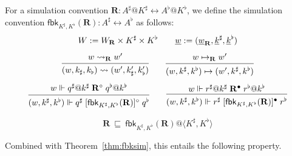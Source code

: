 \documentclass[acmsmall,screen,review,anonymous]{acmart}
\newcommand{\kw}[1]{\ensuremath{ \mathsf{#1} }}
\newcommand{\que}{\circ}
\newcommand{\ans}{\bullet}
\newcommand{\intl}[1]{\underline{#1}}
\begin{document}
\begin{definition}
For a simulation convention
$\mathbf{R} : A^\sharp@K^\sharp \leftrightarrow A^\flat@K^\flat$,
we define the simulation convention
$\kw{fbk}_{K^\sharp,K^\flat}(\mathbf{R}) :
 A^\sharp \leftrightarrow A^\flat$
as follows:
\begin{gather*}
  W := W_\mathbf{R} \times K^\sharp \times K^\flat
  \qquad \intl{w} := (\intl{w}_\mathbf{R}, \intl{k}^\sharp, \intl{k}^\flat)
  \\[1ex]
 {\begin{prooftree}
    \hypo{w \leadsto_\mathbf{R} w'}
    \infer1{(w, k_\sharp, k_\flat) \leadsto (w', k_\sharp', k_\flat')}
  \end{prooftree}}
  \qquad
 {\begin{prooftree}
    \hypo{w \mapsto_\mathbf{R} w'}
    \infer1{(w, k^\sharp, k^\flat) \mapsto (w', k^\sharp, k^\flat)}
  \end{prooftree}}
  \\[1ex]
 {\begin{prooftree}
    \hypo{w \Vdash q^\sharp@k^\sharp \mathrel{\mathbf{R}^\que}
                   q^\flat@k^\flat}
    \infer1{
      (w, k^\sharp, k^\flat) \Vdash
      q^\sharp
      \mathrel{[\kw{fbk}_{K^\sharp,K^\flat}(\mathbf{R})]^\que}
      q^\flat}
  \end{prooftree}}
  \qquad
 {\begin{prooftree}
    \hypo{w \Vdash r^\sharp@k^\sharp \mathrel{\mathbf{R}^\ans}
                   r^\flat@k^\flat}
    \infer1{
      (w, k^\sharp, k^\flat) \Vdash
      r^\sharp
      \mathrel{[\kw{fbk}_{K^\sharp,K^\flat}(\mathbf{R})]^\ans}
      r^\flat}
  \end{prooftree}}
\end{gather*}
\end{definition}

\begin{lemma}
\[
  \mathbf{R}
  \:\sqsubseteq\:
  \kw{fbk}_{K^\sharp,K^\flat}(\mathbf{R})@\langle K^\sharp, K^\flat \rangle
\]
\end{lemma}


Combined with Theorem~\ref{thm:fbksim},
this entails the following property.
\end{document}
